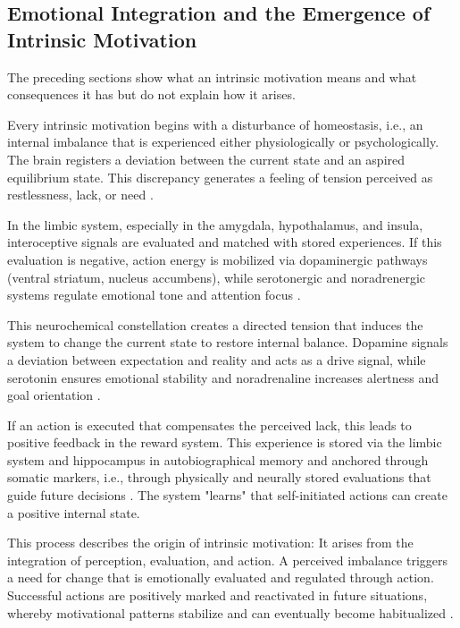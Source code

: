 \subsection*{Emotional Integration and the Emergence of Intrinsic Motivation}

The preceding sections show what an intrinsic motivation means and what consequences it has but do not explain how it arises.

Every intrinsic motivation begins with a disturbance of homeostasis, i.e., an internal imbalance that is experienced either physiologically or psychologically. The brain registers a deviation between the current state and an aspired equilibrium state. This discrepancy generates a feeling of tension perceived as restlessness, lack, or need \cite{Friston2010, CarverScheier1998}.

In the limbic system, especially in the amygdala, hypothalamus, and insula, interoceptive signals are evaluated and matched with stored experiences. If this evaluation is negative, action energy is mobilized via dopaminergic pathways (ventral striatum, nucleus accumbens), while serotonergic and noradrenergic systems regulate emotional tone and attention focus \cite{LeDoux1996, Panksepp1998}.

This neurochemical constellation creates a directed tension that induces the system to change the current state to restore internal balance. Dopamine signals a deviation between expectation and reality and acts as a drive signal, while serotonin ensures emotional stability and noradrenaline increases alertness and goal orientation \cite{Schultz1997, AstonJones2005, Cools2008}.

If an action is executed that compensates the perceived lack, this leads to positive feedback in the reward system. This experience is stored via the limbic system and hippocampus in autobiographical memory and anchored through somatic markers, i.e., through physically and neurally stored evaluations that guide future decisions \cite{Damasio1994, Damasio1999}. The system "learns" that self-initiated actions can create a positive internal state.

This process describes the origin of intrinsic motivation: It arises from the integration of perception, evaluation, and action. A perceived imbalance triggers a need for change that is emotionally evaluated and regulated through action. Successful actions are positively marked and reactivated in future situations, whereby motivational patterns stabilize and can eventually become habitualized \cite{Hebb1949, Graybiel2008, YinKnowlton2006}.

